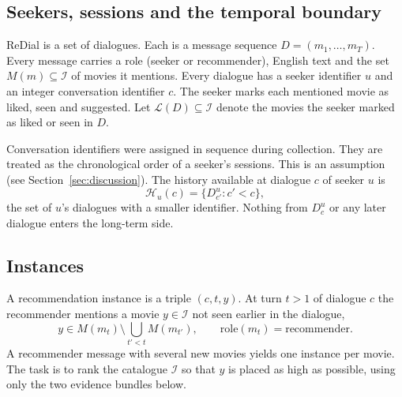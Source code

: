 \subsection{Seekers, sessions and the temporal boundary}
ReDial is a set of dialogues. Each is a message sequence $D=(m_1,\dots,m_T)$. Every message carries a role (seeker or recommender), English text and the set $M(m)\subseteq\mathcal{I}$ of movies it mentions. Every dialogue has a seeker identifier $u$ and an integer conversation identifier $c$. The seeker marks each mentioned movie as liked, seen and suggested. Let $\mathcal{L}(D)\subseteq\mathcal{I}$ denote the movies the seeker marked as liked or seen in $D$.

Conversation identifiers were assigned in sequence during collection. They are treated as the chronological order of a seeker's sessions. This is an assumption (see Section~\ref{sec:discussion}). The history available at dialogue $c$ of seeker $u$ is
\begin{equation}
  \label{eq:history}
  \mathcal{H}_u(c)=\{D^{u}_{c'} : c'<c\},
\end{equation}
the set of $u$'s dialogues with a smaller identifier. Nothing from $D^{u}_{c}$ or any later dialogue enters the long-term side.

\subsection{Instances}
A recommendation instance is a triple $(c,t,y)$. At turn $t>1$ of dialogue $c$ the recommender mentions a movie $y\in\mathcal{I}$ not seen earlier in the dialogue,
\begin{equation}
  \label{eq:target}
  y\in M(m_t)\setminus\textstyle\bigcup_{t'<t} M(m_{t'}),\qquad \mathrm{role}(m_t)=\text{recommender}.
\end{equation}
A recommender message with several new movies yields one instance per movie. The task is to rank the catalogue $\mathcal{I}$ so that $y$ is placed as high as possible, using only the two evidence bundles below.

